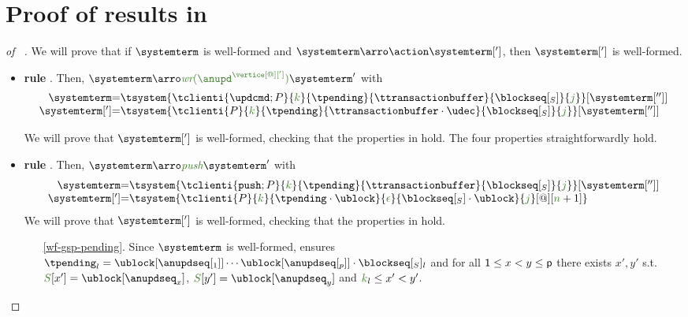 \section{Proof of results in }

\begin{proof} [of ~]
 We will prove that if $\systemterm$ is well-formed and $\systemterm\arroi{\action}\systemterm[']$, then $\systemterm[']$ is well-formed.



			
	\begin{itemize}

		\item {\bf rule }. Then, $\systemterm  \arroi{\updatetranaux{\anupd^{\vertice[@][']}}} \systemterm '$ with 
				\[\begin{array}{r@{=}l}
					\systemterm & \tsystem{\tclienti{\tupdateins}{\tknown}{\tpending}{\ttransactionbuffer}{\tsent}{\treceivebuffer}}[{\systemterm['']}]
					\\
					\systemterm['] & \tsystem{\tclienti{\tprogram}{\tknown}{\tpending}{\ttransactionbuffer \cdot \tupdate}{\tsent}{\treceivebuffer}}[{\systemterm['']}]	
				  \end{array}
				\]
				
				We will prove that $\systemterm[']$ is well-formed, checking that the properties in  hold. The four properties straightforwardly hold.
		
		\item {\bf rule }. Then, $\systemterm  \arroi{\pushtran} \systemterm '$ with 
				\[\begin{array}{r@{=}l}
					\systemterm & \tsystem{\tclienti{\tpushins}{\tknown}{\tpending}{\ttransactionbuffer}{\tsent}{\treceivebuffer}}[{\systemterm['']}]
					\\
					\systemterm['] & \tsystem{\tclienti{\tprogram}{\tknown}{\tpending \cdot \ublock}{\emptysequence}{\tsent \cdot \ublock}{\treceivebuffer}[@][{\trounds+1}]}	
				  \end{array}
				\]
				We will prove that $\systemterm[']$ is well-formed, checking that the properties in  hold.

				\begin{enumerate}
					\item[\ref{wf-gsp-pending}.] Since $\systemterm$ is well-formed,  ensures
					$\tpending_l = \ublock[{\anupdseq[_1]}]\cdots\ublock[{\anupdseq[_p]}]\cdot\tsent_l$ and 
  for all ${\sf 1} \leq x < y \leq{\sf p}$ there exists $x',y'$ s.t. $\queuemessage[x'] = \ublock[{\anupdseq}_x]$, $\queuemessage[y'] =\ublock[{\anupdseq}_y]$ and 
  $\tknown_l\leq x' < y'$.
					
				\end{enumerate}	
		\end{itemize}		
	
\end{proof}
